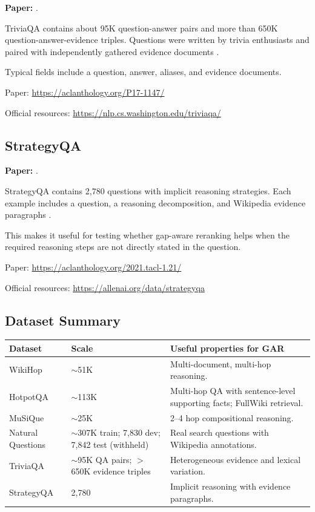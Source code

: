 \documentclass[11pt,a4paper]{article}
\begin{document}
\textbf{Paper:} \citet{joshi-etal-2017-triviaqa}.

TriviaQA contains about 95K question-answer pairs and more than 650K question-answer-evidence triples. Questions were written by trivia enthusiasts and paired with independently gathered evidence documents \citep{joshi-etal-2017-triviaqa}.

Typical fields include a question, answer, aliases, and evidence documents.

Paper:
\url{https://aclanthology.org/P17-1147/}

Official resources:
\url{https://nlp.cs.washington.edu/triviaqa/}

\subsection{StrategyQA}

\textbf{Paper:} \citet{geva-etal-2021-strategyqa}.

StrategyQA contains 2,780 questions with implicit reasoning strategies. Each example includes a question, a reasoning decomposition, and Wikipedia evidence paragraphs \citep{geva-etal-2021-strategyqa}.

This makes it useful for testing whether gap-aware reranking helps when the required reasoning steps are not directly stated in the question.

Paper:
\url{https://aclanthology.org/2021.tacl-1.21/}

Official resources:
\url{https://allenai.org/data/strategyqa}

\subsection{Dataset Summary}

\begin{center}
\small
\begin{tabular}{p{2.7cm}p{2.5cm}p{7.3cm}}
\toprule
\textbf{Dataset} & \textbf{Scale} & \textbf{Useful properties for GAR}\\
\midrule
WikiHop & $\sim$51K & Multi-document, multi-hop reasoning.\\
HotpotQA & $\sim$113K & Multi-hop QA with sentence-level supporting facts; FullWiki retrieval.\\
MuSiQue & $\sim$25K & 2--4 hop compositional reasoning.\\
Natural Questions & $\sim$307K train; 7,830 dev; 7,842 test (withheld) & Real search questions with Wikipedia annotations.\\
TriviaQA & $\sim$95K QA pairs; $>$650K evidence triples & Heterogeneous evidence and lexical variation.\\
StrategyQA & 2,780 & Implicit reasoning with evidence paragraphs.\\
\bottomrule
\end{tabular}
\end{center}
\end{document}
